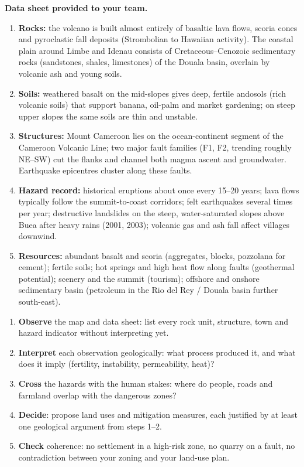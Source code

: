 \documentclass[11pt]{article}
\newcommand{\cle}[1]{{\popxbold\color{popdark}#1}}
\begin{document}
\textbf{Data sheet provided to your team.}
\begin{enumerate}
\item \textbf{Rocks:} the volcano is built almost entirely of \cle{basaltic} lava flows, scoria cones and pyroclastic fall deposits (Strombolian to Hawaiian activity). The coastal plain around Limbe and Idenau consists of Cretaceous--Cenozoic sedimentary rocks (sandstones, shales, limestones) of the Douala basin, overlain by volcanic ash and young soils.
\item \textbf{Soils:} weathered basalt on the mid-slopes gives deep, fertile \cle{andosols} (rich volcanic soils) that support banana, oil-palm and market gardening; on steep upper slopes the same soils are thin and unstable.
\item \textbf{Structures:} Mount Cameroon lies on the ocean-continent segment of the \cle{Cameroon Volcanic Line}; two major fault families (F1, F2, trending roughly NE--SW) cut the flanks and channel both magma ascent and groundwater. Earthquake epicentres cluster along these faults.
\item \textbf{Hazard record:} historical eruptions about once every 15--20 years; lava flows typically follow the summit-to-coast corridors; felt earthquakes several times per year; destructive landslides on the steep, water-saturated slopes above Buea after heavy rains (2001, 2003); volcanic gas and ash fall affect villages downwind.
\item \textbf{Resources:} abundant basalt and scoria (aggregates, blocks, pozzolana for cement); fertile soils; hot springs and high heat flow along faults (geothermal potential); scenery and the summit (tourism); offshore and onshore sedimentary basin (petroleum in the Rio del Rey / Douala basin further south-east).
\end{enumerate}

\begin{methode}
\begin{enumerate}
\item \textbf{Observe} the map and data sheet: list every rock unit, structure, town and hazard indicator without interpreting yet.
\item \textbf{Interpret} each observation geologically: what process produced it, and what does it imply (fertility, instability, permeability, heat)?
\item \textbf{Cross} the hazards with the human stakes: where do people, roads and farmland overlap with the dangerous zones?
\item \textbf{Decide}: propose land uses and mitigation measures, each justified by at least one geological argument from steps 1--2.
\item \textbf{Check} coherence: no settlement in a high-risk zone, no quarry on a fault, no contradiction between your zoning and your land-use plan.
\end{enumerate}
\end{methode}
\end{document}
